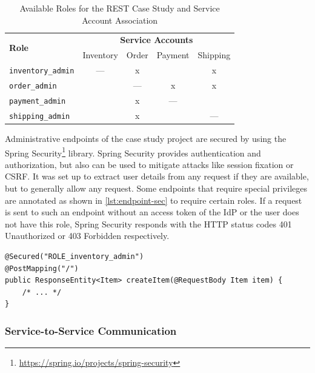 \begin{table}[!htb]
    \centering
    \begin{tabular}{@{}lcccc@{}}
        \toprule
        \multirow{2}{*}{\textbf{Role}}  & \multicolumn{4}{c}{\textbf{Service Accounts}} \\
                                        & Inventory & Order & Payment   & Shipping      \\
        \midrule
        \texttt{inventory\_admin}       & ---       & x     &           & x             \\
        \texttt{order\_admin}           &           & ---   & x         & x             \\
        \texttt{payment\_admin}         &           & x     & ---       &               \\
        \texttt{shipping\_admin}        &           & x     &           & ---           \\
        \bottomrule
        
    \end{tabular}
    \caption{Available Roles for the \ac{REST} Case Study and Service Account Association}\label{tab:roles-rest}
\end{table}

Administrative endpoints of the case study project are secured by using the Spring Security\footnote{\url{https://spring.io/projects/spring-security}} library.
Spring Security provides authentication and authorization, but also can be used to mitigate attacks like session fixation or \ac{CSRF}.
It was set up to extract user details from any request if they are available, but to generally allow any request.
Some endpoints that require special privileges are annotated as shown in \autoref{lst:endpoint-sec} to require certain roles.
If a request is sent to such an endpoint without an access token of the \ac{IdP} or the user does not have this role, Spring Security responds with the \ac{HTTP} status codes 401 Unauthorized or 403 Forbidden respectively.

\begin{lstlisting}[caption={Securing \ac{REST} Endpoints using Spring Security}, style=java-ext, label={lst:endpoint-sec}]
@Secured("ROLE_inventory_admin")
@PostMapping("/")
public ResponseEntity<Item> createItem(@RequestBody Item item) {
    /* ... */
}
\end{lstlisting}

\subsubsection{Service-to-Service Communication}


